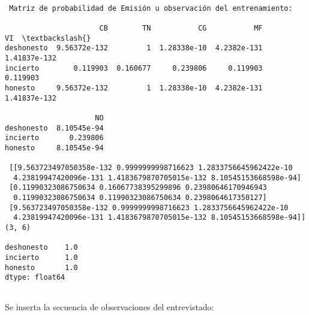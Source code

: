 \documentclass[11pt]{article}
\begin{document}
    \begin{Verbatim}[commandchars=\\\{\}]

 Matriz de probabilidad de Emisión u observación del entrenamiento:

                      CB        TN           CG           MF            VI  \textbackslash{}
deshonesto  9.56372e-132         1  1.28338e-10  4.2382e-131  1.41837e-132
incierto        0.119903  0.160677     0.239806     0.119903      0.119903
honesto     9.56372e-132         1  1.28338e-10  4.2382e-131  1.41837e-132

                     NO
deshonesto  8.10545e-94
incierto       0.239806
honesto     8.10545e-94

 [[9.563723497050358e-132 0.9999999998716623 1.2833756645962422e-10
  4.23819947420096e-131 1.4183679870705015e-132 8.10545153668598e-94]
 [0.11990323086750634 0.16067738395299896 0.23980646170946943
  0.11990323086750634 0.11990323086750634 0.2398064617350127]
 [9.563723497050358e-132 0.9999999998716623 1.2833756645962422e-10
  4.23819947420096e-131 1.4183679870705015e-132 8.10545153668598e-94]] (3, 6)

deshonesto    1.0
incierto      1.0
honesto       1.0
dtype: float64


\end{Verbatim}

    Se inserta la secuencia de observaciones del entrevistado:
\end{document}
